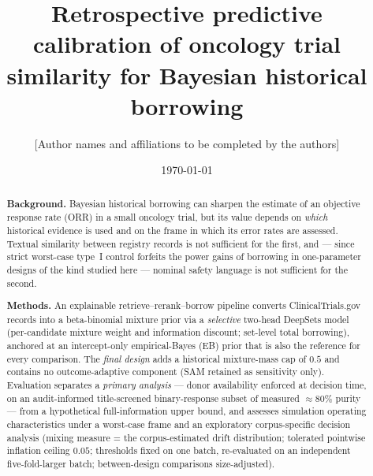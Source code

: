 \documentclass[11pt]{article}
\title{Retrospective predictive calibration of oncology trial similarity
for Bayesian historical borrowing}
\author{[Author names and affiliations to be completed by the authors]}
\date{\today}
\begin{document}
\maketitle

\begin{abstract}
\noindent\textbf{Background.} Bayesian historical borrowing can sharpen the
estimate of an objective response rate (ORR) in a small oncology trial, but
its value depends on \emph{which} historical evidence is used and on the
frame in which its error rates are assessed. Textual similarity between
registry records is not sufficient for the first, and --- since strict
worst-case type~I control forfeits the power gains of borrowing in
one-parameter designs of the kind studied here ---
nominal safety language is not sufficient for the second.

\noindent\textbf{Methods.} An explainable retrieve--rerank--borrow pipeline
converts ClinicalTrials.gov records into a beta-binomial mixture prior via
a \emph{selective} two-head DeepSets model (per-candidate mixture weight
and information discount; set-level total borrowing), anchored at an
intercept-only empirical-Bayes (EB) prior that is also the reference for
every comparison. The \emph{final design} adds a historical mixture-mass
cap of $0.5$ and contains no outcome-adaptive component (SAM retained as
sensitivity only). Evaluation separates a \emph{primary analysis} ---
donor availability enforced at decision time, on an audit-informed
title-screened binary-response subset of measured $\approx 80\%$ purity --- from a
hypothetical full-information upper bound, and assesses simulation
operating characteristics under a worst-case frame and an exploratory
corpus-specific decision analysis (mixing measure = the corpus-estimated
drift distribution; tolerated pointwise inflation ceiling $0.05$;
thresholds fixed on one batch, re-evaluated on an independent
five-fold-larger batch; between-design comparisons size-adjusted).


\end{abstract}
\end{document}
